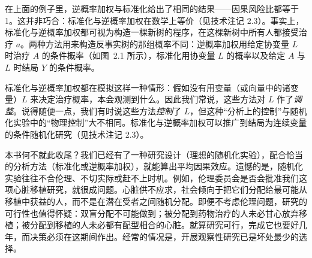 在上面的例子里，逆概率加权与标准化给出了相同的结果——因果风险比都等于 1。这并非巧合：标准化与逆概率加权在数学上等价（见技术注记 2.3）。事实上，标准化与逆概率加权都可视为构造一棵新树的程序，在这棵新树中所有人都接受治疗 $a$。两种方法用来构造反事实树的那组概率不同：逆概率加权用给定协变量 $L$ 时治疗 $A$ 的条件概率（如图~2.1 所示），标准化用协变量 $L$ 的概率以及给定 $A$ 与 $L$ 时结局 $Y$ 的条件概率。

标准化与逆概率加权都在模拟这样一种情形：假如没有用变量（或向量中的诸变量）$L$ 来决定治疗概率，本会观测到什么。因此我们常说，这些方法对 $L$ 作了\emph{调整}。说得随便一点，我们有时说这些方法\emph{控制}了 $L$，但这种“分析上的控制”与随机化实验中的“物理控制”大不相同。标准化与逆概率加权可以推广到结局为连续变量的条件随机化研究（见技术注记 2.3）。

本书何不就此收尾？我们已经有了一种研究设计（理想的随机化实验），配合恰当的分析方法（标准化或逆概率加权），就能算出平均因果效应。遗憾的是，随机化实验往往不合伦理、不切实际或赶不上时机。例如，伦理委员会是否会批准我们这项心脏移植研究，就很成问题。心脏供不应求，社会倾向于把它们分配给最可能从移植中获益的人，而不是在潜在受者之间随机分配。即便不考虑伦理问题，研究的可行性也值得怀疑：双盲分配不可能做到；被分配到药物治疗的人未必甘心放弃移植；被分配到移植的人未必都有配型相合的心脏。就算研究可行，完成它也要好几年，而决策必须在这期间作出。经常的情况是，开展观察性研究已是坏处最少的选择。

